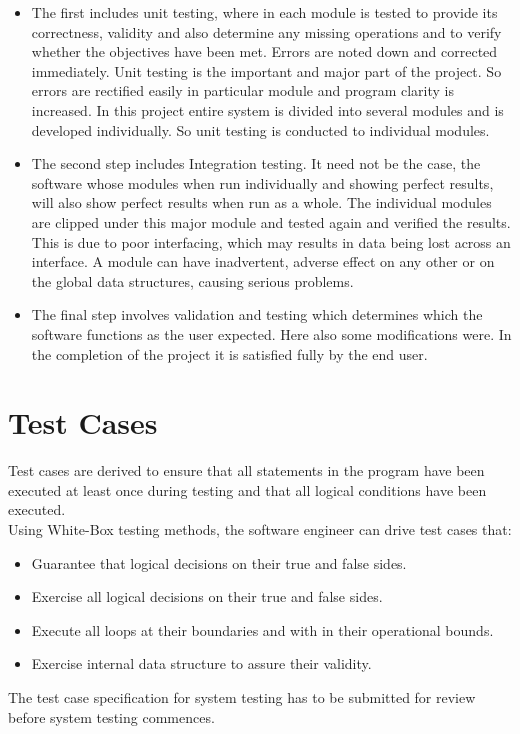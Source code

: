 \documentclass[12pt,a4 paper]{report}
\begin{document}
\begin{itemize}   
\item The first includes unit testing, where in each module is tested to provide its correctness, validity and also determine any missing operations and to verify whether the objectives have been met. Errors are noted down and corrected immediately. Unit testing is the important and major part of the project. So errors are rectified easily in particular module and program clarity is increased. In this project entire system is divided into several modules and is developed individually.  So unit testing is conducted to individual modules. 

\item The second step includes Integration testing. It need not be the case, the software whose modules when run individually and showing perfect results, will also show perfect results when run as a whole. The individual modules are clipped under this major module and tested again and verified the results. This is due to poor interfacing, which may results in data being lost across an interface. A module can have inadvertent, adverse effect on any other or on the global data structures, causing serious problems. 

\item The final step involves validation and testing which determines which the software functions as the user expected. Here also some modifications were. In the completion of the project it is satisfied fully by the end user. 
\end{itemize}

\section{Test Cases}
 
Test cases are derived to ensure that all statements in the program have been executed at least once during testing and that all logical conditions have been executed. \\

Using White-Box testing methods, the software engineer can drive test cases that:
\begin{itemize}
\item Guarantee that logical decisions on their true and false sides. 
\item Exercise all logical decisions on their true and false sides.  
\item Execute all loops at their boundaries and with in their operational bounds.  
\item Exercise internal data structure to assure their validity. 
\end{itemize}
The test case specification for system testing has to be submitted for review before system testing commences.
\end{document}
